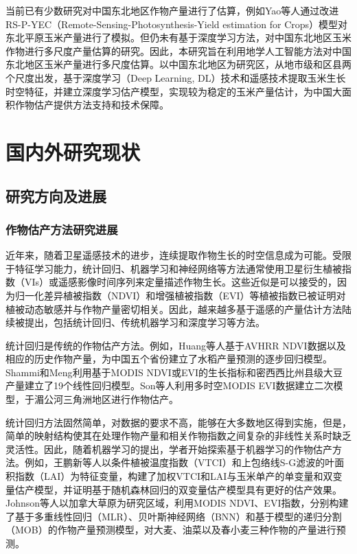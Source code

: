 \par 当前已有少数研究对中国东北地区作物产量进行了估算，例如Yao等人通过改进RS-P-YEC（Remote-Sensing-Photosynthesis-Yield estimation for Crops）模型对东北平原玉米产量进行了模拟\cite{yao2015estimation}。但仍未有基于深度学习方法，对中国东北地区玉米作物进行多尺度产量估算的研究。因此，本研究旨在利用地学人工智能方法对中国东北地区玉米产量进行多尺度估算。以中国东北地区为研究区，从地市级和区县两个尺度出发，基于深度学习（Deep Learning, DL）技术和遥感技术提取玉米生长时空特征，并建立深度学习估产模型，实现较为稳定的玉米产量估计，为中国大面积作物估产提供方法支持和技术保障。

\section{国内外研究现状}

\subsection{研究方向及进展}

\subsubsection{作物估产方法研究进展}

\par 近年来，随着卫星遥感技术的进步，连续提取作物生长的时空信息成为可能\cite{WEISS2020111402}。受限于特征学习能力，统计回归、机器学习和神经网络等方法通常使用卫星衍生植被指数（VIs）\cite{shammi2021use, stas2016comparison}或遥感影像时间序列\cite{8367850, nagy2018wheat}来定量描述作物生长。这些近似是可以接受的，因为归一化差异植被指数（NDVI）和增强植被指数（EVI）等植被指数已被证明对植被动态敏感\cite{sellers1987canopy, tucker1979red}并与作物产量密切相关\cite{shanahan2001use}。因此，越来越多基于遥感的产量估计方法陆续被提出，包括统计回归、传统机器学习和深度学习等方法。

\par 统计回归是传统的作物估产方法。例如，Huang等人\cite{huang2013remotely}基于AVHRR NDVI数据以及相应的历史作物产量，为中国五个省份建立了水稻产量预测的逐步回归模型。Shammi和Meng\cite{shammi2021use}利用基于MODIS NDVI或EVI的生长指标和密西西比州县级大豆产量建立了19个线性回归模型。Son等人\cite{son2014comparative}利用多时空MODIS EVI数据建立二次模型，于湄公河三角洲地区进行作物估产。

\par 统计回归方法固然简单，对数据的要求不高，能够在大多数地区得到实施，但是，简单的映射结构使其在处理作物产量和相关作物指数之间复杂的非线性关系时缺乏灵活性\cite{balaghi2008empirical, ren2008regional}。因此，随着机器学习的提出，学者开始探索基于机器学习的作物估产方法。例如，王鹏新等人\cite{NYJX201907026}以条件植被温度指数（VTCI）和上包络线S-G滤波的叶面积指数（LAI）为特征变量，构建了加权VTCI和LAI与玉米单产的单变量和双变量估产模型，并证明基于随机森林回归的双变量估产模型具有更好的估产效果。Johnson等人\cite{johnson2016crop}以加拿大草原为研究区域，利用MODIS NDVI、EVI指数，分别构建了基于多重线性回归（MLR）、贝叶斯神经网络（BNN）和基于模型的递归分割（MOB）的作物产量预测模型，对大麦、油菜以及春小麦三种作物的产量进行预测。

